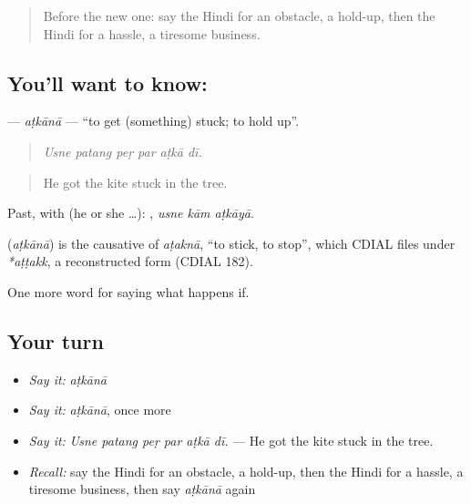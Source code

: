 \label{lesson:HI-C541-atkana}



\begin{quote}
Before the new one: say the Hindi for an obstacle, a hold-up, then the Hindi for a hassle, a tiresome business.
\end{quote}

\subsection*{You'll want to know: }
\textbf{} — \emph{aṭkānā} — \textquotedblleft{}to get (something) stuck; to hold up\textquotedblright{}.

\begin{quote}
     
\end{quote}

\begin{quote}
\emph{Usne patang peṛ par aṭkā dī.}
\end{quote}

\begin{quote}
He got the kite stuck in the tree.
\end{quote}

Past, with  (he or she …):   , \emph{usne kām aṭkāyā}.

\begin{cousinweb}
\textbf{} (\emph{aṭkānā}) is the causative of \emph{aṭaknā}, \textquotedblleft{}to stick, to stop\textquotedblright{}, which CDIAL files under \emph{*aṭṭakk}, a reconstructed form (CDIAL 182).
\end{cousinweb}

\begin{grammarlens}[title={What you've built}]
One more word for saying what happens if.
\end{grammarlens}

\subsection*{Your turn}
\begin{itemize}
\raggedright
  \item \emph{Say it:} \emph{aṭkānā}
  \item \emph{Say it:} \emph{aṭkānā}, once more
  \item \emph{Say it:} \emph{Usne patang peṛ par aṭkā dī.} — He got the kite stuck in the tree.
  \item \emph{Recall:} say the Hindi for an obstacle, a hold-up, then the Hindi for a hassle, a tiresome business, then say \emph{aṭkānā} again
\end{itemize}

